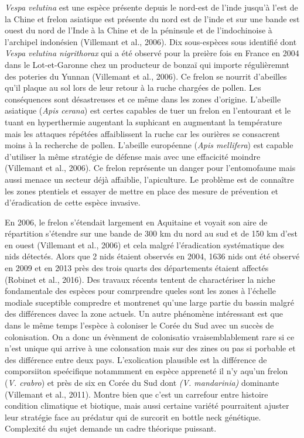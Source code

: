 \emph{Vespa velutina} est une espèce présente depuis le nord-est de
l'inde jusqu'à l'est de la Chine et frelon asiatique est présente du
nord est de l'inde et sur une bande est ouest du nord de l'Inde à la
Chine et de la péninsule et de l'indochinoise à l'archipel indonésien
(Villemant et al., 2006). Dix sous-espèces sous identifié dont
\emph{Vespa velutina nigrithorax} qui a été observé pour la preière fois
en France en 2004 dans le Lot-et-Garonne chez un producteur de bonzaï
qui importe régulièremnt des poteries du Yunnan (Villemant et al.,
2006). Ce frelon se nourrit d'abeilles qu'il plaque au sol lors de leur
retour à la ruche chargées de pollen. Les conséquences sont désastreuses
et ce même dans les zones d'origine. L'abeille asiatique (\emph{Apis
cerana}) est certes capables de tuer un frelon en l'entourant et le
tuant en hyperthermie augentant la suphicant en augmentant la
température mais les attaques répétées affaiblissent la ruche car les
ourières se consacrent moins à la recherche de pollen. L'abeille
européenne (\emph{Apis mellifera}) est capable d'utiliser la même
stratégie de défense mais avec une effacicité moindre (Villemant et al.,
2006). Ce frelon représente un danger pour l'entomofaune mais aussi
menace un secteur déjà affaiblie, l'apiculture. Le problème est de
connaître les zones ptentiels et essayer de mettre en place des mesure
de prévention et d'éradication de cette espèce invasive.

En 2006, le frelon s'étendait largement en Aquitaine et voyait son aire
de répartition s'étendre sur une bande de 300 km du nord au sud et de
150 km d'est en ouest (Villemant et al., 2006) et cela malgré
l'éradication systématique des nids détectés. Alors que 2 nids étaient
observés en 2004, 1636 nids ont été observé en 2009 et en 2013 près des
trois quarts des départements étaient affectés (Robinet et al., 2016).
Des travaux récents tentent de charactériser la niche fondamentale des
espèces pour comrprendre queles sont les zones à l'échelle modiale
suceptible compredre et montrenet qu'une large partie du bassin malgré
des différences davec la zone actuels. Un autre phénomène intéressant
est que dans le même temps l'espèce à coloniser le Corée du Sud avec un
succès de colonisation. On a donc un évènment de colonisatio
vraisemblablement rare si ce n'est unique qui arrive à une colonsation
mais sur des zines ou pas si porbable et des différence entre deux pays.
L'exolication plausible est la différence de comporsiiton speécifique
notammment en espèce appreneté il n'y aqu'un frelon (\emph{V. crabro})
et près de six en Corée du Sud dont \emph{(V. mandarinia)} dominante
(Villemant et al., 2011). Montre bien que c'est un carrefour entre
histoire condition climatique et biotique, mais aussi certaine variété
pourraitent ajuster leur stratégie face au prédatur qui de surcorit en
bottle neck génétique. Complexité du sujet demande un cadre théorique
puissant.

